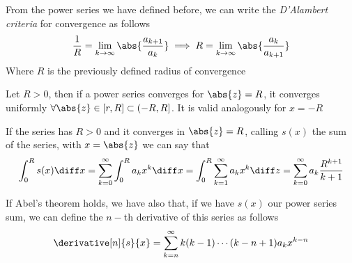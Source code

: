 \documentclass[../mmf.tex]{subfiles}
\begin{document}
\begin{thm}
	From the power series we have defined before, we can write the \textit{D'Alambert criteria} for convergence as follows
	\begin{equation}
		\frac{1}{R}=\lim_{k\to\infty}\abs{\frac{a_{k+1}}{a_k}}\implies{} R=\lim_{k\to\infty}\abs{\frac{a_k}{a_{k+1}}}
		\label{eq:dalambertcriteria}
	\end{equation}
	Where $R$ is the previously defined radius of convergence
\end{thm}
\begin{thm}[Abel]
	Let $R>0$, then if a power series converges for $\abs{z}=R$, it converges uniformly $\forall\abs{z}\in[r,R]\subset(-R,R]$. It is valid analogously for $x=-R$
\end{thm}
\begin{rmk}
	If the series has $R>0$ and it converges in $\abs{z}=R$, calling $s(x)$ the sum of the series, with $x=\abs{z}$ we can say that
	\begin{equation}
		\int_{0}^{R}s(x)\diff x=\sum_{k=0}^{\infty}\int_{0}^{R}a_kx^k\diff x=\int_0^R\sum_{k=1}^{\infty}a_kx^k\diff z=\sum_{k=0}^{\infty}a_k\frac{R^{k+1}}{k+1}
		\label{eq:abelint}
	\end{equation}
\end{rmk}
\begin{rmk}
	If Abel's theorem holds, we have also that, if we have $s(x)$ our power series sum, we can define the $n-$th derivative of this series as follows
	\begin{equation}
		\derivative[n]{s}{x}=\sum_{k=n}^{\infty}k(k-1)\cdots(k-n+1)a_kx^{k-n}
		\label{eq:nthderpowerseries}
	\end{equation}
\end{rmk}
\end{document}
